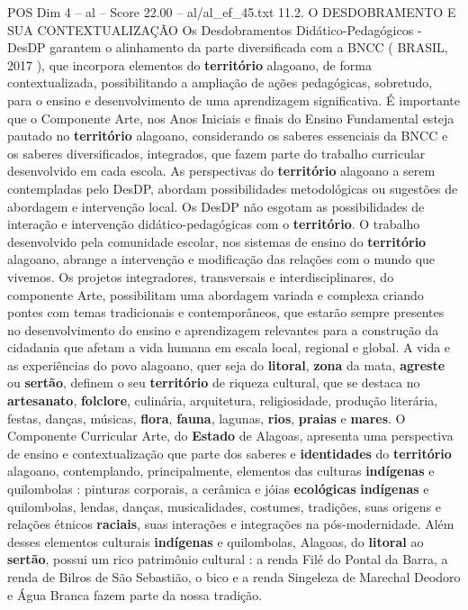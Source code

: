 \begin{textsample}{POS Dim 4 – al – Score 22.00 – al/al\_ef\_45.txt}  \label{ex:f4_pos_044}
11.2.
O DESDOBRAMENTO E SUA CONTEXTUALIZAÇÃO Os Desdobramentos Didático-Pedagógicos - DesDP garantem o alinhamento da parte diversificada com a BNCC ( BRASIL, 2017 ), que incorpora elementos do \textbf{território} alagoano, de forma contextualizada, possibilitando a ampliação de ações pedagógicas, sobretudo, para o ensino e desenvolvimento de uma aprendizagem significativa.
É importante que o Componente Arte, nos Anos Iniciais e finais do Ensino Fundamental esteja pautado no \textbf{território} alagoano, considerando os saberes essenciais da BNCC e os saberes diversificados, integrados, que fazem parte do trabalho curricular desenvolvido em cada escola.
As perspectivas do \textbf{território} alagoano a serem contempladas pelo DesDP, abordam possibilidades metodológicas ou sugestões de abordagem e intervenção local.
Os DesDP não esgotam as possibilidades de interação e intervenção didático-pedagógicas com o \textbf{território}.
O trabalho desenvolvido pela comunidade escolar, nos sistemas de ensino do \textbf{território} alagoano, abrange a intervenção e modificação das relações com o mundo que vivemos.
Os projetos integradores, transversais e interdisciplinares, do componente Arte, possibilitam uma abordagem variada e complexa criando pontes com temas tradicionais e contemporâneos, que estarão sempre presentes no desenvolvimento do ensino e aprendizagem relevantes para a construção da cidadania que afetam a vida humana em escala local, regional e global.
A vida e as experiências do povo alagoano, quer seja do \textbf{litoral}, \textbf{zona} da mata, \textbf{agreste} ou \textbf{sertão}, definem o seu \textbf{território} de riqueza cultural, que se destaca no \textbf{artesanato}, \textbf{folclore}, culinária, arquitetura, religiosidade, produção literária, festas, danças, músicas, \textbf{flora}, \textbf{fauna}, lagunas, \textbf{rios}, \textbf{praias} e \textbf{mares}.
O Componente Curricular Arte, do \textbf{Estado} de Alagoas, apresenta uma perspectiva de ensino e contextualização que parte dos saberes e \textbf{identidades} do \textbf{território} alagoano, contemplando, principalmente, elementos das culturas \textbf{indígenas} e quilombolas : pinturas corporais, a cerâmica e jóias \textbf{ecológicas} \textbf{indígenas} e quilombolas, lendas, danças, musicalidades, costumes, tradições, suas origens e relações étnicos \textbf{raciais}, suas interações e integrações na pós-modernidade.
Além desses elementos culturais \textbf{indígenas} e quilombolas, Alagoas, do \textbf{litoral} ao \textbf{sertão}, possui um rico patrimônio cultural : a renda Filé do Pontal da Barra, a renda de Bilros de São Sebastião, o bico e a renda Singeleza de Marechal Deodoro e Água Branca fazem parte da nossa tradição.

\end{textsample}
